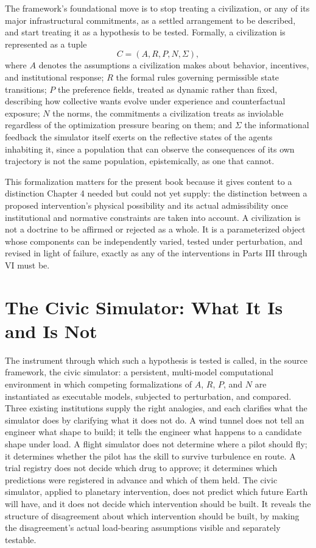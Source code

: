 \documentclass[11pt,oneside]{book}
\begin{document}
The framework's foundational move is to stop treating a civilization, or any of its major infrastructural commitments, as a settled arrangement to be described, and start treating it as a hypothesis to be tested. Formally, a civilization is represented as a tuple
\[
C = (A, R, P, N, \Sigma),
\]
where $A$ denotes the assumptions a civilization makes about behavior, incentives, and institutional response; $R$ the formal rules governing permissible state transitions; $P$ the preference fields, treated as dynamic rather than fixed, describing how collective wants evolve under experience and counterfactual exposure; $N$ the norms, the commitments a civilization treats as inviolable regardless of the optimization pressure bearing on them; and $\Sigma$ the informational feedback the simulator itself exerts on the reflective states of the agents inhabiting it, since a population that can observe the consequences of its own trajectory is not the same population, epistemically, as one that cannot.

This formalization matters for the present book because it gives content to a distinction Chapter 4 needed but could not yet supply: the distinction between a proposed intervention's physical possibility and its actual admissibility once institutional and normative constraints are taken into account. A civilization is not a doctrine to be affirmed or rejected as a whole. It is a parameterized object whose components can be independently varied, tested under perturbation, and revised in light of failure, exactly as any of the interventions in Parts III through VI must be.

\section*{The Civic Simulator: What It Is and Is Not}

The instrument through which such a hypothesis is tested is called, in the source framework, the civic simulator: a persistent, multi-model computational environment in which competing formalizations of $A$, $R$, $P$, and $N$ are instantiated as executable models, subjected to perturbation, and compared. Three existing institutions supply the right analogies, and each clarifies what the simulator does by clarifying what it does not do. A wind tunnel does not tell an engineer what shape to build; it tells the engineer what happens to a candidate shape under load. A flight simulator does not determine where a pilot should fly; it determines whether the pilot has the skill to survive turbulence en route. A trial registry does not decide which drug to approve; it determines which predictions were registered in advance and which of them held. The civic simulator, applied to planetary intervention, does not predict which future Earth will have, and it does not decide which intervention should be built. It reveals the structure of disagreement about which intervention should be built, by making the disagreement's actual load-bearing assumptions visible and separately testable.
\end{document}
